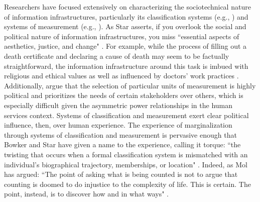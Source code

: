 Researchers have focused extensively on characterizing the sociotechnical nature of information infrastructures, particularly its classification systems (e.g., \citep{Bowker2000Sorting,Bowker2000Bio,Bjorn2007Health,Moller2011Layers,Randall2011Distributed}) and systems of measurement (e.g., \citep{Pine2015Politics,Voida2017Currencies,Berg1997OfForms}). As Star asserts, if you overlook the social and political nature of information infrastructures, you miss ``essential aspects of aesthetics, justice, and change" \citep{Star1999Ethnography}. For example, while the process of filling out a death certificate and declaring a cause of death may seem to be factually straightforward, the information infrastructure around this task is imbued with religious and ethical values as well as influenced by doctors' work practices \citep{Bowker2000Sorting}. Additionally,  \citet{Voida2017Currencies} argue that the selection of particular units of measurement is highly political and prioritizes the needs of certain stakeholders over others, which is especially difficult given the asymmetric power relationships in the human services context. Systems of classification and measurement exert clear political influence, then, over human experience. The experience of marginalization through systems of classification and measurement is pervasive enough that Bowker and Star have given a name to the experience, calling it torque: ``the twisting that occurs when a formal classification system is mismatched with an individual's biographical trajectory, memberships, or location" \citep{Bowker2000Sorting}. Indeed, as Mol has argued: ``The point of asking what is being counted is not to argue that counting is doomed to do injustice to the complexity of life. This is certain. The point, instead, is to discover how and in what ways" \citep{Mol2002Cutting}. 


